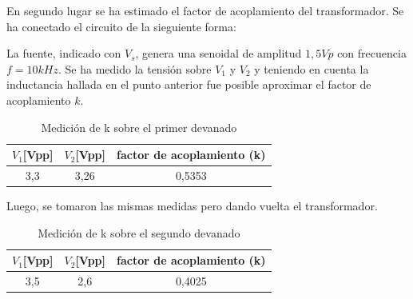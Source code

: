 En segundo lugar se ha estimado el factor de acoplamiento del transformador. Se ha conectado el circuito de la sieguiente forma:

\begin{figure}[H]
    \centering
\end{figure}

La fuente, indicado con $V_s$, genera una senoidal de amplitud $1,5Vp$ con frecuencia $f=10kHz$. Se ha medido la tensión sobre $V_1$ y $V_2$ y teniendo en cuenta la inductancia hallada en el punto anterior fue posible aproximar el factor de acoplamiento $k$.

\begin{table}[H]
    \centering
    \label{tab:k_1}
    
    \begin{tabular}{|c|c|c|}
        \hline
            $V_1$[Vpp] & $V_2$[Vpp] & factor de acoplamiento (k) \\ 
        \hline
        3,3 & 3,26 & 0,5353\\
        \hline
    \end{tabular}
    
    \caption{Medición de k sobre el primer devanado}
\end{table}

Luego, se tomaron las mismas medidas pero dando vuelta el transformador. 

\begin{table}[H]
    \centering
    \label{tab:k_2}
    
    \begin{tabular}{|c|c|c|}
        \hline
            $V_1$[Vpp] & $V_2$[Vpp] & factor de acoplamiento (k) \\ 
        \hline
        3,5 & 2,6 & 0,4025\\
        \hline
    \end{tabular}
    
   \caption{Medición de k sobre el segundo devanado}
\end{table}

